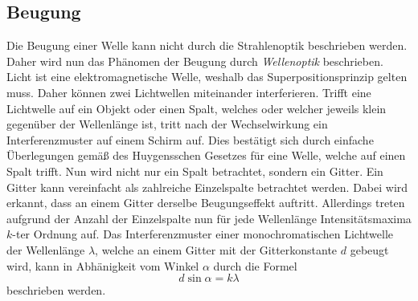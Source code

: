 \subsection{Beugung}
\label{subsec:Beugung}
Die Beugung einer Welle kann nicht durch die Strahlenoptik beschrieben werden. Daher wird nun das Phänomen der Beugung durch \textit{Wellenoptik} beschrieben. Licht ist eine
elektromagnetische Welle, weshalb das Superpositionsprinzip gelten muss. Daher können zwei Lichtwellen miteinander interferieren. 
Trifft eine Lichtwelle auf ein Objekt oder einen Spalt, welches oder welcher jeweils klein gegenüber der Wellenlänge ist, tritt
nach der Wechselwirkung ein Interferenzmuster auf einem Schirm auf. Dies bestätigt sich durch einfache Überlegungen gemäß des Huygensschen Gesetzes für eine Welle, welche auf 
einen Spalt trifft. Nun wird nicht nur ein Spalt betrachtet, sondern ein Gitter. Ein Gitter kann vereinfacht als zahlreiche Einzelspalte betrachtet werden. Dabei wird erkannt, 
dass an einem Gitter derselbe Beugungseffekt auftritt. Allerdings treten aufgrund der Anzahl der Einzelspalte nun für jede Wellenlänge Intensitätsmaxima $k$-ter Ordnung auf.
Das Interferenzmuster einer monochromatischen Lichtwelle der Wellenlänge $\lambda$, welche an einem Gitter mit der Gitterkonstante $d$ gebeugt wird, kann in Abhänigkeit vom 
Winkel $\alpha$ durch die Formel
\begin{equation}
  \label{eqn:Beugung}
  d\sin\alpha = k\lambda
\end{equation} 
beschrieben werden.